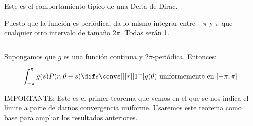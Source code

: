 \begin{itemize}
			Este es el comportamiento típico de una Delta de Dirac.

			\begin{center}
			\end{center}

			\noindent Puesto que la función es periódica, da lo mismo integrar entre $-\pi$ y $\pi$ que cualquier otro intervalo de tamaño $2\pi$. Todas serán 1.

		\end{itemize}

		\begin{theorem} \label{thm:ConvUniformePoisson}
			$ $ %

			\noindent Supongamos que $g$ es una función continua y $2\pi$-periódica. Entonces:

			\[ \int^\pi_{-\pi} g(s)P(r, \theta-s) \dif s \convs[][r][1^-] g(\theta) \text{ uniformemente en } [-\pi,\pi] \]

			IMPORTANTE: Este es el primer teorema que vemos en el que se nos indica el límite a parte de darnos convergencia uniforme. Usaremos este teorema como base para ampliar los resultados anteriores.
		\end{theorem}

